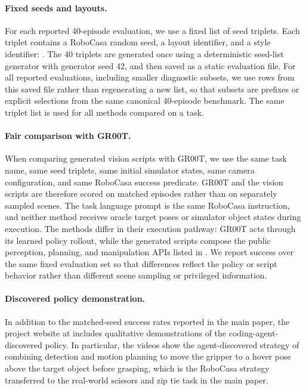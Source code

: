 \paragraph{Fixed seeds and layouts.}
For each reported 40-episode evaluation, we use a fixed list of seed triplets.
Each triplet contains a RoboCasa random seed, a layout identifier, and a style
identifier: \texttt{}.
The 40 triplets are generated once using a deterministic seed-list generator
with generator seed 42, and then saved as a static evaluation file. For all
reported evaluations, including smaller diagnostic subsets, we use rows from
this saved file rather than regenerating a new list, so that subsets are
prefixes or explicit selections from the same canonical 40-episode benchmark.
The same triplet list is used for all methods compared on a task.


\paragraph{Fair comparison with GR00T.}
When comparing generated vision scripts with GR00T, we use the same task name,
same seed triplets, same initial simulator states, same camera configuration,
and same RoboCasa success predicate. GR00T and the vision scripts are therefore
scored on matched episodes rather than on separately sampled scenes. The task
language prompt is the same RoboCasa instruction, and neither method receives
oracle target poses or simulator object states during execution. The methods
differ in their execution pathway: GR00T acts through its learned policy
rollout, while the generated scripts compose the public perception, planning,
and manipulation APIs listed in . We report success over the same fixed evaluation set so that differences reflect the policy or script behavior rather than different scene sampling or privileged information.

\paragraph{Discovered policy demonstration.}
In addition to the matched-seed success rates reported in the main paper, the
project website at \website includes qualitative
demonstrations of the coding-agent-discovered policy. In particular, the videos
show the agent-discovered strategy of combining detection and motion planning to
move the gripper to a hover pose above the target object before grasping, which
is the RoboCasa strategy transferred to the real-world scissors and zip tie
task in the main paper.


